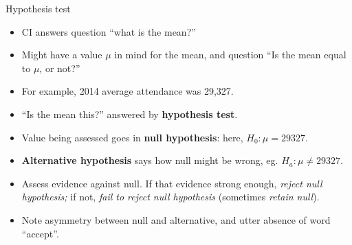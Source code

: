\documentclass[ignorenonframetext,]{beamer}
\providecommand{\tightlist}{%
  \setlength{\itemsep}{0pt}\setlength{\parskip}{0pt}}
\begin{document}
\begin{frame}{Hypothesis test}
\protect\hypertarget{hypothesis-test}{}

\begin{itemize}
\tightlist
\item
  CI answers question ``what is the mean?''
\item
  Might have a value \(\mu\) in mind for the mean, and question ``Is the
  mean equal to \(\mu\), or not?''
\item
  For example, 2014 average attendance was 29,327.
\item
  ``Is the mean this?'' answered by \textbf{hypothesis test}.
\item
  Value being assessed goes in \textbf{null hypothesis}: here,
  \(H_0 : \mu = 29327\).
\item
  \textbf{Alternative hypothesis} says how null might be wrong, eg.
  \(H_a : \mu \ne 29327\).
\item
  Assess evidence against null. If that evidence strong enough,
  \emph{reject null hypothesis;} if not, \emph{fail to reject null
  hypothesis} (sometimes \emph{retain null}).
\item
  Note asymmetry between null and alternative, and utter absence of word
  ``accept''.
\end{itemize}

\end{frame}
\end{document}
